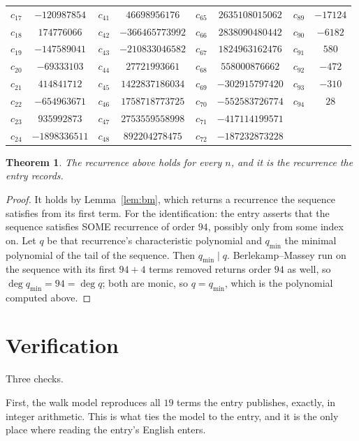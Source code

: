 \documentclass[11pt,a4paper]{article}
\theoremstyle{plain}
\newtheorem{theorem}{Theorem}
\theoremstyle{definition}
\begin{document}
\begin{center}
\begin{tabular}{cccccccc}
$c_{17}$ & $-120987854$ & $c_{41}$ & $46698956176$ & $c_{65}$ & $2635108015062$ & $c_{89}$ & $-17124$ \\
$c_{18}$ & $174776066$ & $c_{42}$ & $-366465773992$ & $c_{66}$ & $2838090480442$ & $c_{90}$ & $-6182$ \\
$c_{19}$ & $-147589041$ & $c_{43}$ & $-210833046582$ & $c_{67}$ & $1824963162476$ & $c_{91}$ & $580$ \\
$c_{20}$ & $-69333103$ & $c_{44}$ & $27721993661$ & $c_{68}$ & $558000876662$ & $c_{92}$ & $-472$ \\
$c_{21}$ & $414841712$ & $c_{45}$ & $1422837186034$ & $c_{69}$ & $-302915797420$ & $c_{93}$ & $-310$ \\
$c_{22}$ & $-654963671$ & $c_{46}$ & $1758718773725$ & $c_{70}$ & $-552583726774$ & $c_{94}$ & $28$ \\
$c_{23}$ & $935992873$ & $c_{47}$ & $2753559558998$ & $c_{71}$ & $-417114199571$ &  &  \\
$c_{24}$ & $-1898336511$ & $c_{48}$ & $892204278475$ & $c_{72}$ & $-187232873228$ &  &  \\
\end{tabular}
\end{center}

\begin{theorem}
The recurrence above holds for every $n$, and it is the recurrence the entry records.
\end{theorem}

\begin{proof}
It holds by Lemma~\ref{lem:bm}, which returns a recurrence the sequence satisfies from its
first term. For the identification: the entry asserts that the sequence satisfies SOME
recurrence of order $94$, possibly only from some index on. Let $q$ be that recurrence's
characteristic polynomial and $q_{\min}$ the minimal polynomial of the tail of the sequence.
Then $q_{\min}\mid q$. Berlekamp--Massey run on the sequence with its first $94+4$ terms
removed returns order $94$ as well, so $\deg q_{\min}=94=\deg q$; both are monic, so
$q=q_{\min}$, which is the polynomial computed above.
\end{proof}

\section{Verification}

Three checks.

First, the walk model reproduces all $19$ terms the entry publishes, exactly, in integer
arithmetic. This is what ties the model to the entry, and it is the only place where reading
the entry's English enters.
\end{document}
